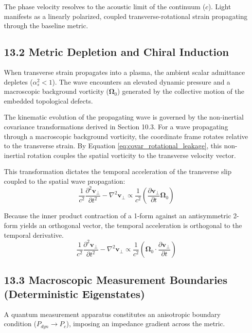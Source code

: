 The phase velocity resolves to the acoustic limit of the continuum ($c$). Light manifests as a linearly polarized, coupled transverse-rotational strain propagating through the baseline metric.


\subsection*{13.2 Metric Depletion and Chiral Induction}
When transverse strain propagates into a plasma, the ambient scalar admittance depletes ($\alpha_s^2 < 1$). The wave encounters an elevated dynamic pressure and a macroscopic background vorticity ($\boldsymbol{\Omega}_0$) generated by the collective motion of the embedded topological defects.

The kinematic evolution of the propagating wave is governed by the non-inertial covariance transformations derived in Section 10.3. For a wave propagating through a macroscopic background vorticity, the coordinate frame rotates relative to the transverse strain. By Equation \ref{eq:covar_rotational_leakage}, this non-inertial rotation couples the spatial vorticity to the transverse velocity vector. 

This transformation dictates the temporal acceleration of the transverse slip coupled to the spatial wave propagation: 
\begin{equation}
    \frac{1}{c^2}\frac{\partial^2 \mathbf{v}_\perp}{\partial t^2} - \nabla^2 \mathbf{v}_\perp \propto \frac{1}{c^2} \left( \frac{\partial \mathbf{v}_\perp}{\partial t} \boldsymbol{\Omega}_0 \right) 
\end{equation}


Because the inner product contraction of a 1-form against an antisymmetric 2-form yields an orthogonal vector, the temporal acceleration is orthogonal to the temporal derivative. 
\begin{equation}
    \frac{1}{c^2}\frac{\partial^2 \mathbf{v}_\perp}{\partial t^2} - \nabla^2 \mathbf{v}_\perp \propto \frac{1}{c^2} \left( \boldsymbol{\Omega}_0 \cdot \frac{\partial \mathbf{v}_\perp}{\partial t} \right) 
\end{equation}


\subsection*{13.3 Macroscopic Measurement Boundaries (Deterministic Eigenstates)} 
A quantum measurement apparatus constitutes an anisotropic boundary condition ($P_{dyn} \to P_c$), imposing an impedance gradient across the metric. 

